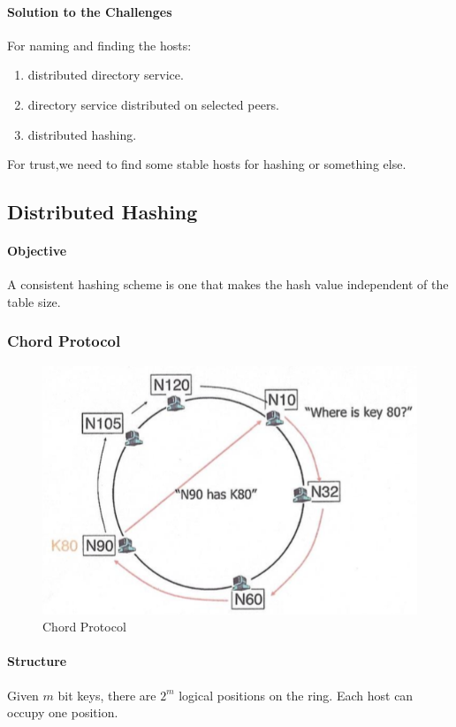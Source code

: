 \paragraph{Solution to the Challenges}
For naming and finding the hosts:
\begin{enumerate}
    \item distributed directory service.
    \item directory service distributed on selected peers.
    \item distributed hashing.
\end{enumerate}
For trust,we need to find some stable hosts for hashing or something else.

\subsection{Distributed Hashing}
\paragraph{Objective}
A consistent hashing scheme is one that makes the hash value independent of the table size.
\subsubsection{Chord Protocol}

\begin{figure}
\centering
\includegraphics[width=\textwidth]{img/ch05-chord.png}
\caption{Chord Protocol}
\label{fig:ch05-chord}
\end{figure}

\paragraph{Structure}
Given $m$ bit keys, there are $2^m$ logical positions on the ring. Each host can occupy one position.

